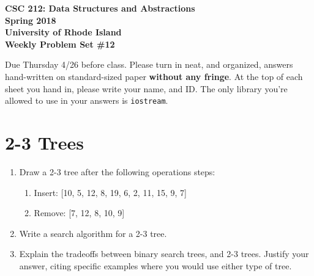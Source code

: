 \documentclass[11pt]{article}
\begin{document}
\thispagestyle{empty}

\begin{center}
    {\Large\bf CSC 212: Data Structures and Abstractions}\\
    \medskip
    {\Large\bf Spring 2018}\\
    \medskip
    {\Large\bf University of Rhode Island}\\
    \bigskip
    {\Large\bf Weekly Problem Set \#12}
\end{center}

Due Thursday 4/26 before class. Please turn in neat, and organized, answers hand-written on standard-sized paper \textbf{without any fringe}. At the top of each sheet you hand in, please write your name, and ID.
The only library you're allowed to use in your answers is \verb|iostream|.

\section{2-3 Trees}
\begin{enumerate}
    \item Draw a 2-3 tree after the following operations steps:
    \begin{enumerate}
        \item Insert: [10, 5, 12, 8, 19, 6, 2, 11, 15, 9, 7]
        \item Remove: [7, 12, 8, 10, 9]
    \end{enumerate}

    \item Write a search algorithm for a 2-3 tree.

    \item Explain the tradeoffs between binary search trees, and 2-3 trees. Justify your answer, citing specific examples where you would use either type of tree.
\end{enumerate}

\label{r:lastpage}
\end{document}
